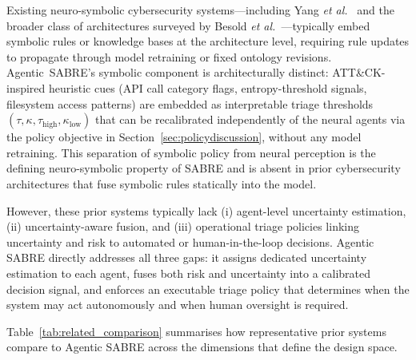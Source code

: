 \documentclass[3p]{elsarticle}
\begin{document}
\begin{changedblock}
Existing neuro-symbolic cybersecurity systems---including Yang \emph{et al.}~\cite{YangSBK25} and the broader class of architectures surveyed by Besold \emph{et al.}~\cite{Besold2021neurosymbolicsurvey}---typically embed symbolic rules or knowledge bases at the architecture level, requiring rule updates to propagate through model retraining or fixed ontology revisions. Agentic~SABRE's symbolic component is architecturally distinct: ATT\&CK-inspired heuristic cues (API call category flags, entropy-threshold signals, filesystem access patterns) are embedded as interpretable triage thresholds $(\tau, \kappa, \tau_{\text{high}}, \kappa_{\text{low}})$ that can be recalibrated independently of the neural agents via the policy objective in Section~\ref{sec:policydiscussion}, without any model retraining. This separation of symbolic policy from neural perception is the defining neuro-symbolic property of SABRE and is absent in prior cybersecurity architectures that fuse symbolic rules statically into the model.
\end{changedblock}

However, these prior systems typically lack (i) agent-level uncertainty
estimation, (ii) uncertainty-aware fusion, and (iii) operational triage policies linking uncertainty and risk to automated or human-in-the-loop decisions. Agentic SABRE directly addresses all three gaps: it assigns dedicated uncertainty estimation to each agent, fuses both risk and uncertainty into a calibrated decision signal, and enforces an executable triage policy that determines when the system may act autonomously and when human oversight is required.

\begin{changedblock}
Table~\ref{tab:related_comparison} summarises how representative prior systems compare to
Agentic SABRE across the dimensions that define the design space.
\end{changedblock}
\end{document}
